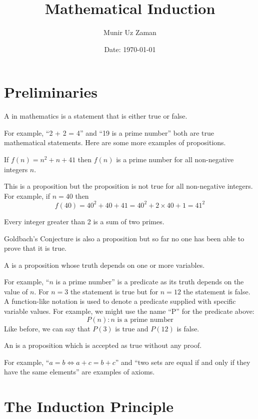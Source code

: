 \documentclass[11pt,numbers=noenddot,svgnames,dvipsnames]{scrartcl}
\title{Mathematical Induction}
\author{Munir Uz Zaman}
\date{Date: \today}
\begin{document}
\maketitle
\tableofcontents

\section{Preliminaries}
\begin{definition}
A  in mathematics is a statement that is either true or false.
\end{definition}
For example, ``2 + 2 = 4'' and ``19 is a prime number'' both are true mathematical statements. 
Here are some more examples of propositions.
\begin{proposition}
    If $f(n) = n^{2} + n + 41$ then $f(n)$ is a prime number for all non-negative integers $n$.
\end{proposition}
This is a proposition but the proposition is not true for all non-negative integers. 
For example, if $n=40$ then 
\[
    f(40) = 40^{2} + 40 + 41 = 40^{2} + 2\times 40 + 1 = 41^{2}
\]
\begin{proposition}
    Every integer greater than 2 is a sum of two primes.
\end{proposition}
Goldbach's Conjecture is also a proposition but so far no one has been able to 
prove that it is true.

\begin{definition}
    A  is a proposition whose truth depends on one or more variables.
\end{definition}
For example, ``$n$ is a prime number'' is a predicate as its truth depends on the value of $n$. 
For $n=3$ the statement is true but for $n=12$ the statement is false. 
A function-like notation is used to denote a predicate supplied with specific variable values. 
For example, we might use the name ``P'' for the predicate above:
\[
P(n) : n\text{ is a prime number}
\]
Like before, we can say that $P(3)$ is true and $P(12)$ is false.

\begin{definition}
    An  is a proposition which is accepted as true without any proof.
\end{definition}
For example, ``$a = b \iff a + c = b + c$'' and ``two sets are equal if and only if they have the same elements'' are 
examples of axioms.

\section{The Induction Principle}
\end{document}
